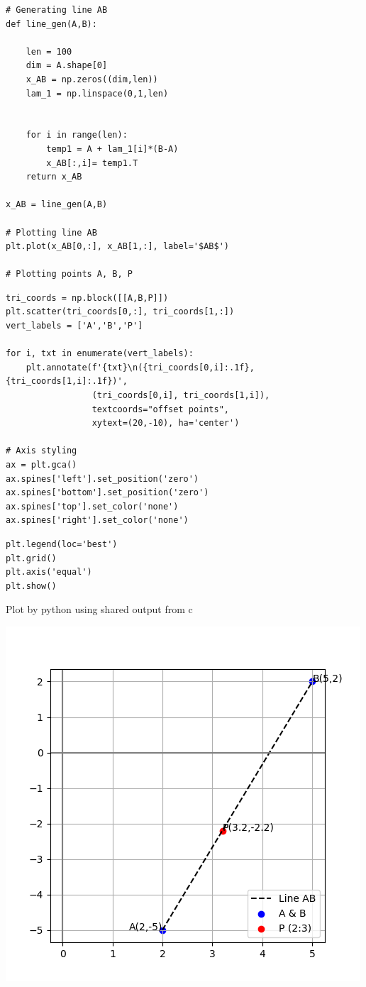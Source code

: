 \documentclass{beamer}
\begin{document}
\begin{frame}[fragile]

\begin{lstlisting}
# Generating line AB
def line_gen(A,B):

    len = 100
    dim = A.shape[0]
    x_AB = np.zeros((dim,len))
    lam_1 = np.linspace(0,1,len)
    
    
    for i in range(len):
        temp1 = A + lam_1[i]*(B-A)
        x_AB[:,i]= temp1.T
    return x_AB

x_AB = line_gen(A,B)

# Plotting line AB
plt.plot(x_AB[0,:], x_AB[1,:], label='$AB$')

# Plotting points A, B, P
\end{lstlisting}
\end{frame}

\begin{frame}[fragile]

\begin{lstlisting}
tri_coords = np.block([[A,B,P]])
plt.scatter(tri_coords[0,:], tri_coords[1,:])
vert_labels = ['A','B','P']

for i, txt in enumerate(vert_labels):
    plt.annotate(f'{txt}\n({tri_coords[0,i]:.1f}, {tri_coords[1,i]:.1f})',
                 (tri_coords[0,i], tri_coords[1,i]),
                 textcoords="offset points",
                 xytext=(20,-10), ha='center')

# Axis styling
ax = plt.gca()
ax.spines['left'].set_position('zero')
ax.spines['bottom'].set_position('zero')
ax.spines['top'].set_color('none')
ax.spines['right'].set_color('none')
\end{lstlisting}
\end{frame}

\begin{frame}[fragile]

\begin{lstlisting}
plt.legend(loc='best')
plt.grid()
plt.axis('equal')
plt.show()
\end{lstlisting}
\end{frame}


\begin{frame}{Plot by python using shared output from c}
	\begin{center}
		\includegraphics[width=0.6\columnwidth]{figs/fig_1.png}
	\end{center}
\end{frame}
\end{document}
